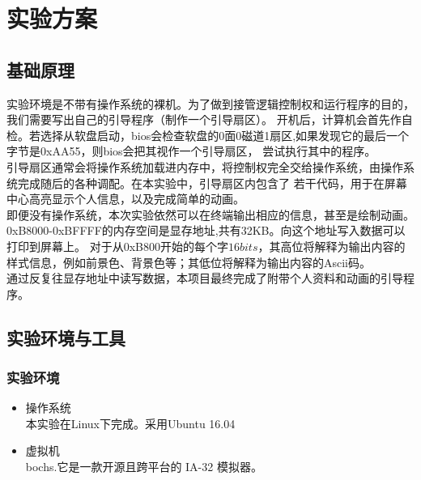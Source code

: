 \documentclass[a4paper]{article}
\begin{document}
\section{实验方案}
\subsection{基础原理}
实验环境是不带有操作系统的裸机。为了做到接管逻辑控制权和运行程序的目的，我们需要写出自己的引导程序（制作一个引导扇区）。
开机后，计算机会首先作自检。若选择从软盘启动，bios会检查软盘的0面0磁道1扇区,如果发现它的最后一个字节是0xAA55，则bios会把其视作一个引导扇区，
尝试执行其中的程序。\\ 

引导扇区通常会将操作系统加载进内存中，将控制权完全交给操作系统，由操作系统完成随后的各种调配。在本实验中，引导扇区内包含了
若干代码，用于在屏幕中心高亮显示个人信息，以及完成简单的动画。 \\

即便没有操作系统，本次实验依然可以在终端输出相应的信息，甚至是绘制动画。
0xB8000-0xBFFFF的内存空间是显存地址,共有32KB。向这个地址写入数据可以打印到屏幕上。
对于从0xB800开始的每个字\(16 bits\)，其高位将解释为输出内容的样式信息，例如前景色、背景色等；其低位将解释为输出内容的Ascii码。\\

通过反复往显存地址中读写数据，本项目最终完成了附带个人资料和动画的引导程序。



\subsection{实验环境与工具}
\subsubsection{实验环境}
\begin{itemize}
    \item 操作系统 \\ 
    本实验在Linux下完成。采用Ubuntu 16.04
    \item 虚拟机\\
    bochs.它是一款开源且跨平台的 IA-32 模拟器。
\end{itemize}
\end{document}
